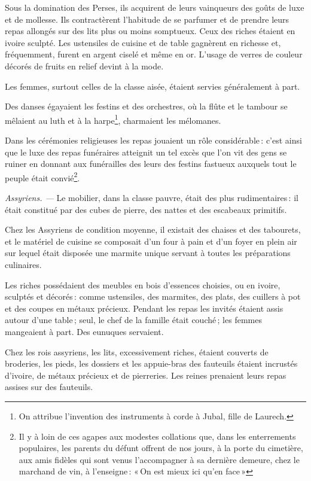 Sous la domination des Perses, ils acquirent de leurs vainqueurs des goûts de
luxe et de mollesse. Ils contractèrent l'habitude de se parfumer et de prendre
leurs repas allongés sur des lits plus ou moins somptueux. Ceux des riches
étaient en ivoire sculpté. Les ustensiles de cuisine et de table gagnèrent en
richesse et, fréquemment, furent en argent ciselé et même en or. L'usage de
verres de couleur décorés de fruits en relief devint à la mode.

Les femmes, surtout celles de la classe aisée, étaient servies généralement
à part.

Des danses égayaient les festins et des orchestres, où la flûte et le tambour
se mêlaient au luth et à la harpe\footnote{On attribue l'invention des
instruments à corde à Jubal, fille de Laurech.}, charmaient les mélomanes.

Dans les cérémonies religieuses les repas jouaient un rôle considérable : c'est
ainsi que le luxe des repas funéraires atteignit un tel excès que l'on vit des
gens se ruiner en donnant aux funérailles des leurs des festins fastueux
auxquels tout le peuple était convié\footnote{Il y à loin de ces agapes aux
modestes collations que, dans les enterrements populaires, les parents du
défunt offrent de nos jours, à la porte du cimetière, aux amis fidèles qui sont
venus l'accompagner à sa dernière demeure, chez le marchand de vin,
à l'enseigne : « On est mieux ici qu'en face »}. 

\textit{Assyriens. —} Le mobilier, dans la classe pauvre, était des plus
rudimentaires : il était constitué par des cubes de pierre, des nattes et des
escabeaux primitifs.

Chez les Assyriens de condition moyenne, il existait des chaises et des
tabourets, et le matériel de cuisine se composait d'un four à pain et d'un
foyer en plein air sur lequel était disposée une marmite unique servant
à toutes les préparations culinaires.

Les riches possédaient des meubles en bois d'essences choisies, ou en ivoire,
sculptés et décorés : comme ustensiles, des marmites, des plats, des cuillers
à pot et des coupes en métaux précieux. Pendant les repas les invités étaient
assis autour d'une table ; seul, le chef de la famille était couché ; les
femmes mangeaient à part. Des eunuques servaient.

Chez les rois assyriens, les lits, excessivement riches, étaient couverts de
broderies, les pieds, les dossiers et les appuie-bras des fauteuils étaient
incrustés d'ivoire, de métaux précieux et de pierreries. Les reines prenaient
leurs repas assises sur des fauteuils.

